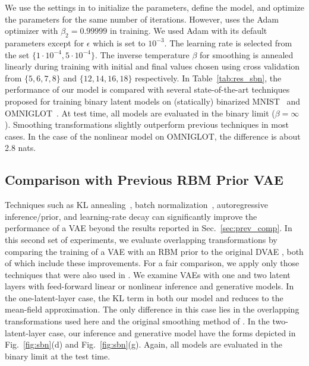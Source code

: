 \documentclass{article}
\begin{document}
We use the settings in \cite{tucker2017rebar} to initialize the parameters, define the model,
and optimize the parameters for the same number of iterations. However, 
\cite{tucker2017rebar} uses the Adam optimizer with $\beta_2=0.99999$ in training. We used Adam with its default parameters except for $\epsilon$ which is set to $10^{-3}$. The learning rate is selected from the set $\{1\cdot 10^{-4}, 5 \cdot 10^{-4}\}$. The inverse temperature $\beta$ for smoothing is annealed linearly during training with initial and final values chosen using cross validation from $\{5, 6, 7, 8\}$ and 
$\{12, 14, 16, 18\}$ respectively. In Table~\ref{tab:res_sbn}, the performance of our model is compared
with several state-of-the-art techniques proposed for training
binary latent models on (statically) binarized MNIST~\cite{salakhutdinov2008dbn} and OMNIGLOT~\cite{lake2015human}. At test time, all models are evaluated in the binary limit ($\beta=\infty$).
Smoothing transformations slightly outperform previous techniques in most cases. In the case of the nonlinear model on OMNIGLOT, the difference is about 2.8 nats. 

\subsection{Comparison with Previous RBM Prior VAE} \label{sec:prev_vae}

Techniques such as KL annealing~\cite{sonderby2016ladder}, batch normalization~\cite{ioffe2015batch}, 
autoregressive inference/prior, and learning-rate decay can significantly improve the performance of a VAE beyond the results reported in Sec.~\ref{sec:prev_comp}.
In this second set of experiments, we evaluate overlapping transformations by comparing the training of a VAE with an RBM prior to the original DVAE \cite{rolfe2016discrete}, both of which include these improvements. 
For a fair comparison, we apply only those techniques that were also used in \cite{rolfe2016discrete}. We examine VAEs with one and two latent layers with feed-forward linear or nonlinear 
inference and generative models. In the one-latent-layer case, the KL term in both our model and \cite{rolfe2016discrete}
reduces to the mean-field approximation.
The only difference in this case lies in the overlapping 
transformations used here and the original smoothing method of \cite{rolfe2016discrete}. 
In the two-latent-layer case, our inference and generative model have the forms depicted in Fig.~\ref{fig:sbn}(d) and Fig.~\ref{fig:sbn}(g).
Again, all models are evaluated in the binary limit at the test time.
\end{document}
